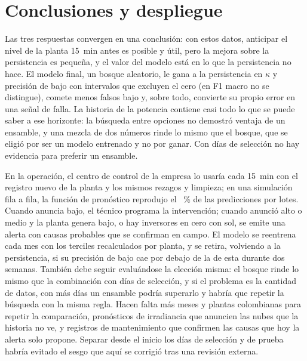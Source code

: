 \documentclass[conference]{IEEEtran}
\begin{document}
\section{Conclusiones y despliegue}
Las tres respuestas convergen en una conclusi\'on: con estos datos, anticipar el nivel de la planta 15~min antes es posible y \'util, pero la mejora sobre la persistencia es peque\~na, y el valor del modelo est\'a en lo que la persistencia no hace. El modelo final, un bosque aleatorio, le gana a la persistencia en $\kappa$ y precisi\'on de bajo con intervalos que excluyen el cero (en F1 macro no se distingue), comete menos falsos bajo y, sobre todo, convierte su propio error en una se\~nal de falla. La historia de la potencia contiene casi todo lo que se puede saber a ese horizonte: la b\'usqueda entre \nopciones{} opciones no demostr\'o ventaja de un ensamble, y una mezcla de dos n\'umeros rinde lo mismo que el bosque, que se eligi\'o por ser un modelo entrenado y no por ganar. Con \ndiassel{} d\'ias de selecci\'on no hay evidencia para preferir un ensamble.

En la operaci\'on, el centro de control de la empresa lo usar\'ia cada 15~min con el registro nuevo de la planta y los mismos rezagos y limpieza; en una simulaci\'on fila a fila, la funci\'on de pron\'ostico reprodujo el \psimcoincide{}~\% de las predicciones por lotes. Cuando anuncia bajo, el t\'ecnico programa la intervenci\'on; cuando anunci\'o alto o medio y la planta genera bajo, o hay inversores en cero con sol, se emite una alerta con causas probables que se confirman en campo. El modelo se reentrena cada mes con los terciles recalculados por planta, y se retira, volviendo a la persistencia, si su precisi\'on de bajo cae por debajo de la de esta durante dos semanas. Tambi\'en debe seguir evalu\'andose la elecci\'on misma: el bosque rinde lo mismo que la combinaci\'on con \ndiassel{} d\'ias de selecci\'on, y si el problema es la cantidad de datos, con m\'as d\'ias un ensamble podr\'ia superarlo y habr\'ia que repetir la b\'usqueda con la misma regla.
Hacen falta m\'as meses y plantas colombianas para repetir la comparaci\'on, pron\'osticos de irradiancia que anuncien las nubes que la historia no ve, y registros de mantenimiento que confirmen las causas que hoy la alerta solo propone. Separar desde el inicio los d\'ias de selecci\'on y de prueba habr\'ia evitado el sesgo que aqu\'i se corrigi\'o tras una revisi\'on externa.
\end{document}
